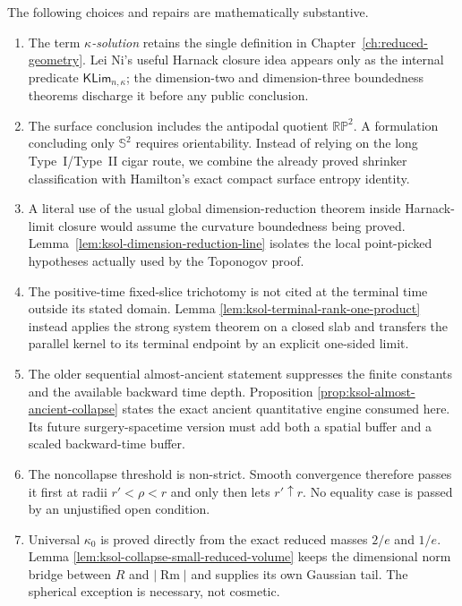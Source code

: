 \documentclass[10pt]{coll-l}
\newcommand{\Sph}{\mathbb{S}}
\theoremstyle{definition}
\theoremstyle{remark}
\numberwithin{section}{chapter}
\numberwithin{equation}{chapter}
\newcommand{\Rm}{\operatorname{Rm}}
\begin{document}
The following choices and repairs are mathematically substantive.
\begin{enumerate}
\item The term \emph{$\kappa$-solution} retains the single definition in
      Chapter~\ref{ch:reduced-geometry}.  Lei Ni's useful Harnack closure
      idea appears only as the internal predicate
      $\mathsf{KLim}_{n,\kappa}$; the dimension-two and dimension-three
      boundedness theorems discharge it before any public conclusion.

\item The surface conclusion includes the antipodal quotient
      $\mathbb{RP}^2$.  A formulation concluding only $\Sph^2$ requires
      orientability.  Instead of relying on the long Type~I/Type~II cigar
      route, we combine the already proved shrinker classification with
      Hamilton's exact compact surface entropy identity.

\item A literal use of the usual global dimension-reduction theorem inside
      Harnack-limit closure would assume the curvature boundedness being
      proved.  Lemma~\ref{lem:ksol-dimension-reduction-line} isolates the
      local point-picked hypotheses actually used by the Toponogov proof.

\item The positive-time fixed-slice trichotomy is not cited at the terminal
      time outside its stated domain.  Lemma
      \ref{lem:ksol-terminal-rank-one-product} instead applies the strong
      system theorem on a closed slab and transfers the parallel kernel to
      its terminal endpoint by an explicit one-sided limit.

\item The older sequential almost-ancient statement suppresses the finite
      constants and the available backward time depth.  Proposition
      \ref{prop:ksol-almost-ancient-collapse} states the exact ancient
      quantitative engine consumed here.  Its future surgery-spacetime
      version must add both a spatial buffer and a scaled backward-time
      buffer.

\item The noncollapse threshold is non-strict.  Smooth convergence therefore
      passes it first at radii $r'<\rho<r$ and only then lets $r'\uparrow r$.
      No equality case is passed by an unjustified open condition.

\item Universal $\kappa_0$ is proved directly from the exact reduced masses
      $2/e$ and $1/e$.  Lemma
      \ref{lem:ksol-collapse-small-reduced-volume} keeps the dimensional
      norm bridge between $R$ and $|\Rm|$ and supplies its own Gaussian
      tail.  The spherical exception is necessary, not cosmetic.


\end{enumerate}
\end{document}
